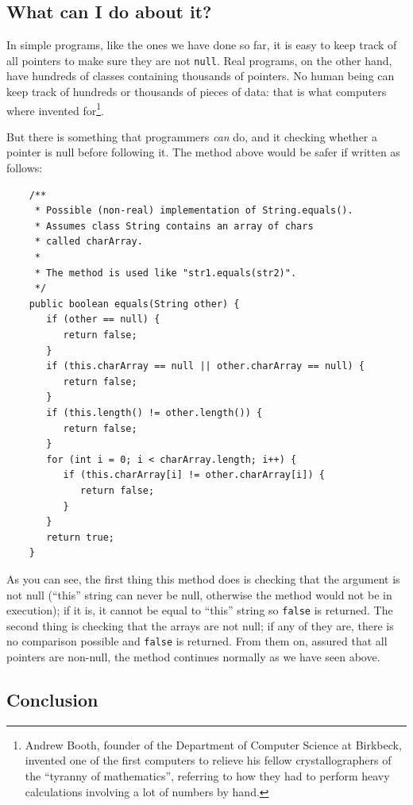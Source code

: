 \subsection{What can I do about it?}
\label{sec:what-can-i}

In simple programs, like the ones we have done so far, it is easy to
keep track of all pointers to make sure they are not \verb+null+. Real
programs, on the other hand, have hundreds of classes containing
thousands of pointers. No human being can keep track of hundreds or
thousands of pieces of data: that is what computers where invented
for\footnote{Andrew Booth, founder of the Department of Computer
  Science at Birkbeck, invented one of the first computers to relieve
  his fellow crystallographers of the “tyranny of mathematics”,
  referring to how they had to perform heavy calculations involving a
  lot of numbers by hand.}.

But there is something that programmers \emph{can} do, and it checking
whether a pointer is null before following it. The method above would
be safer if written as follows: 

\begin{verbatim}
    /** 
     * Possible (non-real) implementation of String.equals().
     * Assumes class String contains an array of chars
     * called charArray.
     * 
     * The method is used like "str1.equals(str2)".
     */
    public boolean equals(String other) {
       if (other == null) {
          return false;
       }
       if (this.charArray == null || other.charArray == null) {
          return false;
       }
       if (this.length() != other.length()) {
          return false;
       }
       for (int i = 0; i < charArray.length; i++) {
          if (this.charArray[i] != other.charArray[i]) {
             return false;
          }
       } 
       return true;
    }
\end{verbatim}

As you can see, the first thing this method does is checking that the
argument is not null (``this'' string can never be null, otherwise the
method would not be in execution); if it is, it cannot be equal to
``this'' string so \verb+false+ is returned. The second thing is
checking that the arrays are not null; if any of they are, there is no
comparison possible and \verb+false+ is returned. From them on,
assured that all pointers are non-null, the method continues normally
as we have seen above. 

\subsection{Conclusion}
\label{sec:conclusion}

